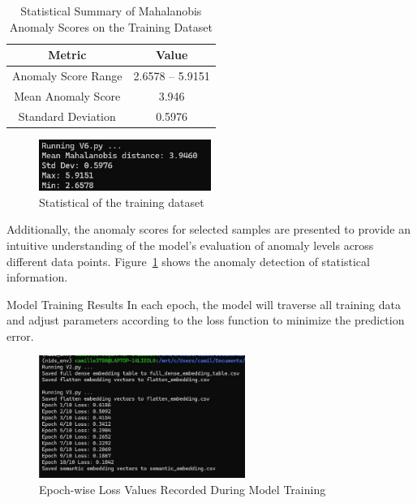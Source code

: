 \begin{ZhChapter}
    \begin{table}[htbp]
        \centering
        \caption{Statistical Summary of Mahalanobis Anomaly Scores on the Training Dataset}
        \vspace{1em}
        \label{tab:mahalanobis_scores}
        \begin{tabular}{|c|c|}
            \hline
            \textbf{Metric}     & \textbf{Value}   \\
            \hline
            Anomaly Score Range & 2.6578 -- 5.9151 \\
            Mean Anomaly Score  & 3.946            \\
            Standard Deviation  & 0.5976           \\
            \hline
        \end{tabular}
    \end{table}


    \begin{figure}[htbp]
        \centering
        \includegraphics[width = 0.5\textwidth]{image/v6.jpg}
        \caption{Statistical of the training dataset}
        \label{fig:v6}
    \end{figure}


    Additionally, the anomaly scores for selected samples are presented to provide an intuitive understanding of the model's evaluation of anomaly levels across different data points. Figure~\ref{fig:v6} shows the anomaly detection of statistical information.



    Model Training Results
    In each epoch, the model will traverse all training data and adjust parameters according to the loss function to minimize the prediction error.



    \begin{figure}[htbp]
        \centering
        \includegraphics[width = 0.6\textwidth]{image/L_20.jpg}
        \caption{Epoch-wise Loss Values Recorded During Model Training}
        \label{fig:Train}
    \end{figure}



\end{ZhChapter}
